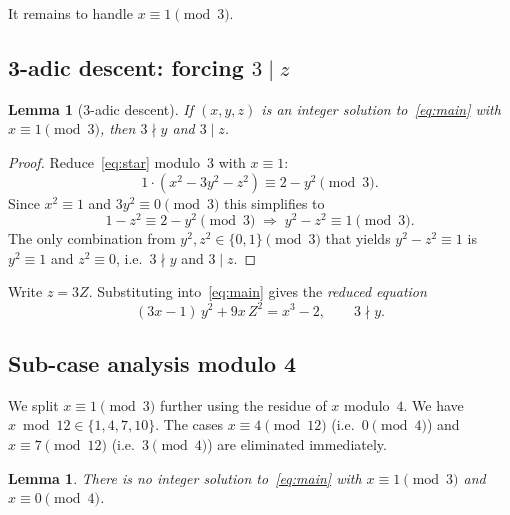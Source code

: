 \documentclass[12pt, a4paper]{amsart}
\theoremstyle{plain}
\newtheorem{lemma}[theorem]{Lemma}
\theoremstyle{definition}
\begin{document}
It remains to handle $x \equiv 1 \pmod{3}$.

\subsection{3-adic descent: forcing \texorpdfstring{$3 \mid z$}{3 | z}}

\begin{lemma}[3-adic descent]\label{lem:descent}
  If $(x,y,z)$ is an integer solution to~\eqref{eq:main} with
  $x \equiv 1 \pmod{3}$, then $3 \nmid y$ and $3 \mid z$.
\end{lemma}

\begin{proof}
  Reduce~\eqref{eq:star} modulo~$3$ with $x \equiv 1$:
  \[
    1 \cdot (x^2 - 3y^2 - z^2) \equiv 2 - y^2 \pmod{3}.
  \]
  Since $x^2 \equiv 1$ and $3y^2 \equiv 0 \pmod{3}$ this simplifies to
  \[
    1 - z^2 \equiv 2 - y^2 \pmod{3}
    \;\Longrightarrow\;
    y^2 - z^2 \equiv 1 \pmod{3}.
  \]
  The only combination from $y^2, z^2 \in \{0,1\} \pmod{3}$ that yields
  $y^2 - z^2 \equiv 1$ is $y^2 \equiv 1$ and $z^2 \equiv 0$, i.e.\
  $3 \nmid y$ and $3 \mid z$.
\end{proof}

\medskip
Write $z = 3Z$.  Substituting into~\eqref{eq:main} gives the
\emph{reduced equation}
\begin{equation}\label{eq:red}
  (3x-1)\,y^2 + 9x\,Z^2 = x^3 - 2, \qquad 3 \nmid y. \tag{$\star$}
\end{equation}

\subsection{Sub-case analysis modulo 4}

We split $x \equiv 1 \pmod{3}$ further using the residue of $x$ modulo~$4$.
We have $x \bmod 12 \in \{1, 4, 7, 10\}$.  The cases $x \equiv 4 \pmod{12}$
(i.e.\ $0 \pmod{4}$) and $x \equiv 7 \pmod{12}$ (i.e.\ $3 \pmod{4}$) are
eliminated immediately.

\begin{lemma}\label{lem:mod4a}
  There is no integer solution to~\eqref{eq:main} with $x \equiv 1 \pmod{3}$
  and $x \equiv 0 \pmod{4}$.
\end{lemma}
\end{document}

